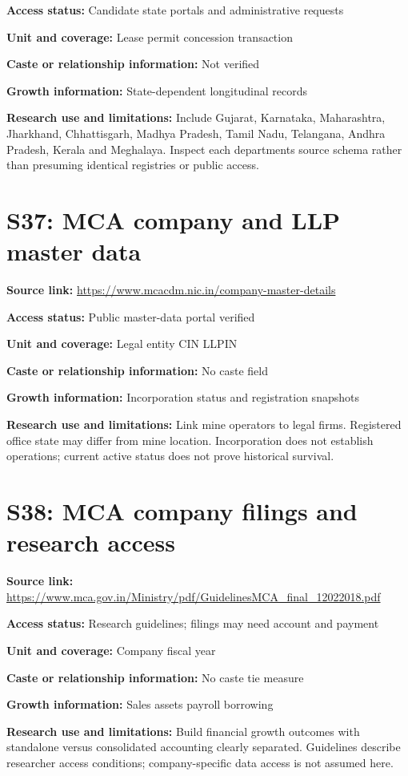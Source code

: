 \documentclass[11pt,a4paper]{report}
\begin{document}
\textbf{Access status:} Candidate state portals and administrative requests

\textbf{Unit and coverage:} Lease permit concession transaction

\textbf{Caste or relationship information:} Not verified

\textbf{Growth information:} State-dependent longitudinal records

\textbf{Research use and limitations:} Include Gujarat, Karnataka, Maharashtra, Jharkhand, Chhattisgarh, Madhya Pradesh, Tamil Nadu, Telangana, Andhra Pradesh, Kerala and Meghalaya. Inspect each departments source schema rather than presuming identical registries or public access.

\section{S37: MCA company and LLP master data}\hypertarget{S37}{}
\textbf{Source link:} \url{https://www.mcacdm.nic.in/company-master-details}

\textbf{Access status:} Public master-data portal verified

\textbf{Unit and coverage:} Legal entity CIN LLPIN

\textbf{Caste or relationship information:} No caste field

\textbf{Growth information:} Incorporation status and registration snapshots

\textbf{Research use and limitations:} Link mine operators to legal firms. Registered office state may differ from mine location. Incorporation does not establish operations; current active status does not prove historical survival.

\section{S38: MCA company filings and research access}\hypertarget{S38}{}
\textbf{Source link:} \url{https://www.mca.gov.in/Ministry/pdf/GuidelinesMCA_final_12022018.pdf}

\textbf{Access status:} Research guidelines; filings may need account and payment

\textbf{Unit and coverage:} Company fiscal year

\textbf{Caste or relationship information:} No caste tie measure

\textbf{Growth information:} Sales assets payroll borrowing

\textbf{Research use and limitations:} Build financial growth outcomes with standalone versus consolidated accounting clearly separated. Guidelines describe researcher access conditions; company-specific data access is not assumed here.
\end{document}
